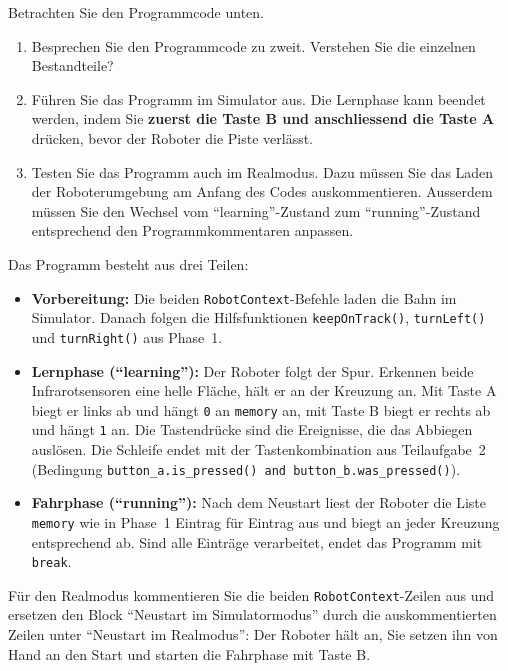 \begin{myexercise}
    Betrachten Sie den Programmcode unten.

    \begin{enumerate}
        \item Besprechen Sie den Programmcode zu zweit.
              Verstehen Sie die einzelnen Bestandteile?

        \item Führen Sie das Programm im Simulator aus.
              Die Lernphase kann beendet werden, indem Sie
              \textbf{zuerst die Taste B und anschliessend
                  die Taste A} drücken, bevor der Roboter
              die Piste verlässt.

        \item Testen Sie das Programm auch im Realmodus. Dazu müssen Sie das Laden der Roboterumgebung am Anfang des Codes auskommentieren. Ausserdem müssen Sie den Wechsel vom \enquote{learning}-Zustand zum \enquote{running}-Zustand entsprechend den Programmkommentaren anpassen.
    \end{enumerate}

    \begin{myanswer}
        Das Programm besteht aus drei Teilen:
        \begin{itemize}
            \item \textbf{Vorbereitung:} Die beiden \texttt{RobotContext}-Befehle laden die Bahn im Simulator. Danach folgen die Hilfsfunktionen \texttt{keepOnTrack()}, \texttt{turnLeft()} und \texttt{turnRight()} aus Phase~1.
            \item \textbf{Lernphase (\enquote{learning}):} Der Roboter folgt der Spur. Erkennen beide Infrarotsensoren eine helle Fläche, hält er an der Kreuzung an. Mit Taste A biegt er links ab und hängt \texttt{0} an \texttt{memory} an, mit Taste B biegt er rechts ab und hängt \texttt{1} an. Die Tastendrücke sind die Ereignisse, die das Abbiegen auslösen. Die Schleife endet mit der Tastenkombination aus Teilaufgabe~2 (Bedingung \texttt{button\_a.is\_pressed() and button\_b.was\_pressed()}).
            \item \textbf{Fahrphase (\enquote{running}):} Nach dem Neustart liest der Roboter die Liste \texttt{memory} wie in Phase~1 Eintrag für Eintrag aus und biegt an jeder Kreuzung entsprechend ab. Sind alle Einträge verarbeitet, endet das Programm mit \texttt{break}.
        \end{itemize}
        Für den Realmodus kommentieren Sie die beiden \texttt{RobotContext}-Zeilen aus und ersetzen den Block \enquote{Neustart im Simulatormodus} durch die auskommentierten Zeilen unter \enquote{Neustart im Realmodus}: Der Roboter hält an, Sie setzen ihn von Hand an den Start und starten die Fahrphase mit Taste B.
    \end{myanswer}
\end{myexercise}


